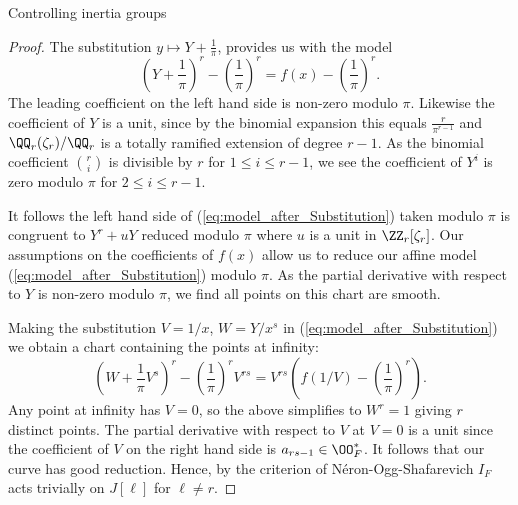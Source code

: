 \documentclass[11pt,a4paper]{article}
\begin{document}
\begin{section}{Controlling inertia groups}
\begin{proof}
The substitution $y \mapsto Y+\frac{1}{\pi}$, provides us with the model
\begin{equation} \label{eq:model_after_Substitution}
\left(Y +\frac{1}{\pi}\right)^r - \left(\frac{1}{\pi}\right)^{r} = f(x) - \left(\frac{1}{\pi}\right)^{r}.
\end{equation}
The leading coefficient on the left hand side is non-zero modulo $\pi$.
Likewise the coefficient of $Y$ is a unit, since by the binomial expansion this equals $\frac{r}{\pi^{r-1}}$ and $\QQ_r(\zeta_r)/ \QQ_r$ is a totally ramified extension of degree $r-1$.
As the binomial coefficient ${r}\choose{i}$ is divisible by $r$ for $1 \leq i \leq r-1$, we see the coefficient of $Y^i$ is zero modulo $\pi$ for $2 \leq i \leq r-1$. 

It follows the left hand side of (\ref{eq:model_after_Substitution}) taken modulo $\pi$ is congruent to $Y^r + uY$ reduced modulo $\pi$ where $u$ is a unit in $\ZZ_r[\zeta_r]$.
Our assumptions on the coefficients of $f(x)$ allow us to reduce our affine model (\ref{eq:model_after_Substitution}) modulo $\pi$.
As the partial derivative with respect to $Y$ is non-zero modulo $\pi$, we find all points on this chart are smooth.

Making the substitution $V = 1/x$, $W = Y/x^s$ in (\ref{eq:model_after_Substitution}) we obtain a chart containing the points at infinity:
$$\left(W+\frac{1}{\pi}V^{s}\right)^r - \left(\frac{1}{\pi}\right)^rV^{rs} = V^{rs}\left(f(1/V)-\left(\frac{1}{\pi}\right)^r\right).$$
Any point at infinity has $V=0$, so the above simplifies to $W^r = 1$ giving $r$ distinct points.
The partial derivative with respect to $V$ at $V=0$ is a unit since the coefficient of $V$ on the right hand side is $a_{rs-1} \in \OO^*_F$. It follows that our curve has good reduction.
Hence, by the criterion of N\'eron-Ogg-Shafarevich $I_F$ acts trivially on $J[\ell]$ for $\ell \neq r$.
\end{proof}
\end{section}
\end{document}
